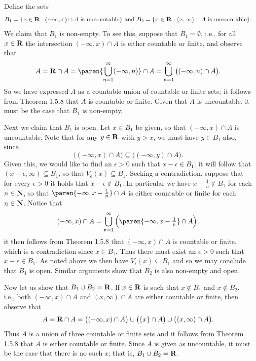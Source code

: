 \documentclass{lew98_solutions}
\begin{document}
\begin{solution}
    Define the sets
    \[
        B_1 = \{ x \in \mathbf{R} : (-\infty, x) \cap A \text{ is uncountable} \} \text{ and } B_2 = \{ x \in \mathbf{R} : (x, \infty) \cap A \text{ is uncountable} \}.
    \]
    We claim that \( B_1 \) is non-empty. To see this, suppose that \( B_1 = \emptyset \), i.e., for all \( x \in \mathbf{R} \) the intersection \( (-\infty, x) \cap A \) is either countable or finite, and observe that
    \[
        A = \R \cap A = \paren{ \bigcup_{n=1}^{\infty} (-\infty, n) } \cap A = \bigcup_{n=1}^{\infty} \big( (-\infty, n) \cap A \big).
    \]
    So we have expressed \( A \) as a countable union of countable or finite sets; it follows from Theorem 1.5.8 that \( A \) is countable or finite. Given that \( A \) is uncountable, it must be the case that \( B_1 \) is non-empty.

    Next we claim that \( B_1 \) is open. Let \( x \in B_1 \) be given, so that \( (-\infty, x) \cap A \) is uncountable. Note that for any \( y \in \mathbf{R} \) with \( y > x \), we must have \( y \in B_1 \) also, since
    \[
        \big( (-\infty, x) \cap A \big) \subseteq \big( (-\infty, y) \cap A \big).
    \]
    Given this, we would like to find an \( \epsilon > 0 \) such that \( x - \epsilon \in B_1 \); it will follow that \( (x - \epsilon, \infty) \subseteq B_1 \), so that \( V_{\epsilon}(x) \subseteq B_1 \). Seeking a contradiction, suppose that for every \( \epsilon > 0 \) it holds that \( x - \epsilon \not\in B_1 \). In particular we have \( x - \tfrac{1}{n} \not\in B_1 \) for each \( n \in \mathbf{N} \), so that \( \paren{ -\infty, x - \tfrac{1}{n} } \cap A \) is either countable or finite for each \( n \in \mathbf{N} \). Notice that
    \[
        (-\infty, x) \cap A = \bigcup_{n=1}^{\infty} \Big( \paren{ -\infty, x - \tfrac{1}{n} } \cap A \Big);
    \]
    it then follows from Theorem 1.5.8 that \( (-\infty, x) \cap A \) is countable or finite, which is a contradiction since \( x \in B_1 \). Thus there must exist an \( \epsilon > 0 \) such that \( x - \epsilon \in B_1 \). As noted above we then have \( V_{\epsilon}(x) \subseteq B_1 \) and so we may conclude that \( B_1 \) is open. Similar arguments show that \( B_2 \) is also non-empty and open.

    Now let us show that \( B_1 \cup B_2 = \mathbf{R} \). If \( x \in \mathbf{R} \) is such that \( x \not\in B_1 \) and \( x \not\in B_2 \), i.e., both \( (-\infty, x) \cap A \) and \( (x, \infty) \cap A \) are either countable or finite, then observe that
    \[
        A = \mathbf{R} \cap A = \big( (-\infty, x) \cap A \big) \cup \big( \{ x \} \cap A \big) \cup \big( (x, \infty) \cap A \big).
    \]
    Thus \( A \) is a union of three countable or finite sets and it follows from Theorem 1.5.8 that \( A \) is either countable or finite. Since \( A \) is given as uncountable, it must be the case that there is no such \( x \); that is, \( B_1 \cup B_2 = \mathbf{R} \).


\end{solution}
\end{document}

